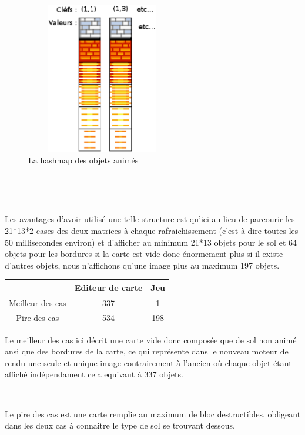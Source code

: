 			\begin{figure}[h]			
				\begin{center}						
					\includegraphics[width=250px, height=250px]{Developpement/Img/hashmap.eps}
					\caption{La hashmap des objets animés}
				\end{center}
			\end{figure}

			$\,$
			
			$\,$

			Les avantages d'avoir utilisé une telle structure est qu'ici au lieu de
			parcourir les 21*13*2 cases des deux matrices à chaque rafraichissement
			(c'est à dire toutes les 50 millisecondes environ) et d'afficher au minimum
			21*13 objets pour le sol et 64 objets pour les bordures si la carte est vide
			donc énormement plus si il existe d'autres objets, nous n'affichons qu'une
			image plus au maximum 197 objets.
			
			\begin{center}
				\begin{tabular}{|c|c|c|} \hline
				  & Editeur de carte & Jeu    \\\hline 
				Meilleur des cas & 337 & 1    \\\hline
				Pire des cas     & 534 & 198  \\\hline		
				\end{tabular}
			\end{center}
			
			Le meilleur des cas ici décrit une carte vide donc composée que de sol non
			animé ansi que des bordures de la carte, ce qui représente dans le nouveau
			moteur de rendu une seule et unique image contrairement à l'ancien où chaque
			objet étant affiché indépendament cela equivaut à 337 objets.
			
			$\,$
			
			Le pire des cas est une carte remplie au maximum de bloc destructibles,
			obligeant dans les deux cas à connaitre le type de sol se trouvant dessous.
			

